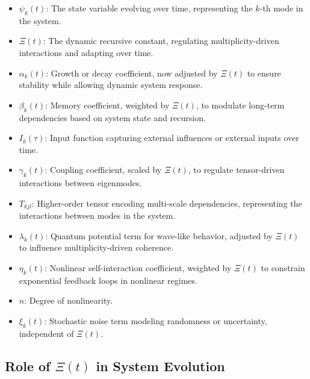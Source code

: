 \documentclass{article}
\theoremstyle{plain}
\begin{document}
\begin{itemize}
    \item \( \psi_k(t) \): The state variable evolving over time, representing the \( k \)-th mode in the system.
    \item \(\Xi(t) \): The dynamic recursive constant, regulating multiplicity-driven interactions and adapting over time.
    \item \( \alpha_k(t) \): Growth or decay coefficient, now adjusted by \(\Xi(t) \) to ensure stability while allowing dynamic system response.
    \item \( \beta_k(t) \): Memory coefficient, weighted by \(\Xi(t) \), to modulate long-term dependencies based on system state and recursion.
    \item \( I_k(\tau) \): Input function capturing external influences or external inputs over time.
    \item \( \gamma_k(t) \): Coupling coefficient, scaled by \(\Xi(t) \), to regulate tensor-driven interactions between eigenmodes.
    \item \( T_{kjl} \): Higher-order tensor encoding multi-scale dependencies, representing the interactions between modes in the system.
    \item \( \lambda_k(t) \): Quantum potential term for wave-like behavior, adjusted by \(\Xi(t) \) to influence multiplicity-driven coherence.
    \item \( \eta_k(t) \): Nonlinear self-interaction coefficient, weighted by \(\Xi(t) \) to constrain exponential feedback loops in nonlinear regimes.
    \item \( n \): Degree of nonlinearity.
    \item \( \xi_k(t) \): Stochastic noise term modeling randomness or uncertainty, independent of \(\Xi(t) \).
\end{itemize}

\subsection{Role of \(\Xi(t) \) in System Evolution}
\end{document}
